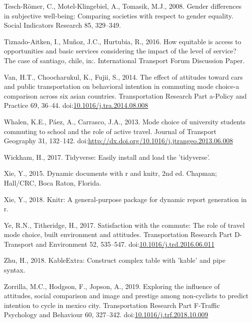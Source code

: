 \documentclass[]{elsarticle} %
\begin{document}
\leavevmode\hypertarget{ref-Tesch2008gender}{}%
Tesch-Römer, C., Motel-Klingebiel, A., Tomasik, M.J., 2008. Gender
differences in subjective well-being: Comparing societies with respect
to gender equality. Social Indicators Research 85, 329--349.

\leavevmode\hypertarget{ref-TiznadoAitken2016}{}%
Tiznado-Aitken, I., Muñoz, J.C., Hurtubia, R., 2016. How equitable is
access to opportunities and basic services considering the impact of the
level of service? The case of santiago, chile, in:. International
Transport Forum Discussion Paper.

\leavevmode\hypertarget{ref-Van2014effect}{}%
Van, H.T., Choocharukul, K., Fujii, S., 2014. The effect of attitudes
toward cars and public transportation on behavioral intention in
commuting mode choice-a comparison across six asian countries.
Transportation Research Part a-Policy and Practice 69, 36--44.
doi:\href{https://doi.org/10.1016/j.tra.2014.08.008}{10.1016/j.tra.2014.08.008}

\leavevmode\hypertarget{ref-Whalen2013mode}{}%
Whalen, K.E., Páez, A., Carrasco, J.A., 2013. Mode choice of university
students commuting to school and the role of active travel. Journal of
Transport Geography 31, 132--142.
doi:\href{https://doi.org/http://dx.doi.org/10.1016/j.jtrangeo.2013.06.008}{http://dx.doi.org/10.1016/j.jtrangeo.2013.06.008}

\leavevmode\hypertarget{ref-Wickham2017}{}%
Wickham, H., 2017. Tidyverse: Easily install and load the 'tidyverse'.

\leavevmode\hypertarget{ref-Xie2015}{}%
Xie, Y., 2015. Dynamic documents with r and knitr, 2nd ed. Chapman;
Hall/CRC, Boca Raton, Florida.

\leavevmode\hypertarget{ref-Xie2018}{}%
Xie, Y., 2018. Knitr: A general-purpose package for dynamic report
generation in r.

\leavevmode\hypertarget{ref-Ye2017satisfaction}{}%
Ye, R.N., Titheridge, H., 2017. Satisfaction with the commute: The role
of travel mode choice, built environment and attitudes. Transportation
Research Part D-Transport and Environment 52, 535--547.
doi:\href{https://doi.org/10.1016/j.trd.2016.06.011}{10.1016/j.trd.2016.06.011}

\leavevmode\hypertarget{ref-Zhu2018}{}%
Zhu, H., 2018. KableExtra: Construct complex table with 'kable' and pipe
syntax.

\leavevmode\hypertarget{ref-Zorrilla2019exploring}{}%
Zorrilla, M.C., Hodgson, F., Jopson, A., 2019. Exploring the influence
of attitudes, social comparison and image and prestige among
non-cyclists to predict intention to cycle in mexico city.
Transportation Research Part F-Traffic Psychology and Behaviour 60,
327--342.
doi:\href{https://doi.org/10.1016/j.trf.2018.10.009}{10.1016/j.trf.2018.10.009}
\end{document}

